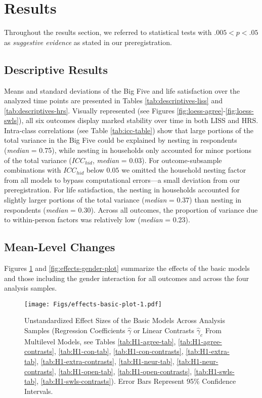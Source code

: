 \documentclass[
  english,
  man,floatsintext]{apa7}
\begin{document}
\hypertarget{results}{%
\section{Results}\label{results}}

Throughout the results section, we referred to statistical tests with \(.005 < p < .05\) as \emph{suggestive evidence} as stated in our preregistration.

\hypertarget{descriptive-results}{%
\subsection{Descriptive Results}\label{descriptive-results}}

Means and standard deviations of the Big Five and life satisfaction over the analyzed time points are presented in Tables \ref{tab:descriptives-liss} and \ref{tab:descriptives-hrs}. Visually represented (see Figures \ref{fig:loess-agree}-\ref{fig:loess-swls}), all six outcomes display marked stability over time in both LISS and HRS. Intra-class correlations (see Table \ref{tab:icc-table}) show that large portions of the total variance in the Big Five could be explained by nesting in respondents (\emph{median} = 0.75), while nesting in households only accounted for minor portions of the total variance (\(ICC_{hid}\), \emph{median} = 0.03). For outcome-subsample combinations with \(ICC_{hid}\) below \(0.05\) we omitted the household nesting factor from all models to bypass computational errors---a small deviation from our preregistration. For life satisfaction, the nesting in households accounted for slightly larger portions of the total variance (\emph{median} = 0.37) than nesting in respondents (\emph{median} = 0.30). Across all outcomes, the proportion of variance due to within-person factors was relatively low (\emph{median} = 0.23).

\hypertarget{mean-level-changes}{%
\subsection{Mean-Level Changes}\label{mean-level-changes}}

Figures \ref{fig:effects-basic-plot} and \ref{fig:effects-gender-plot} summarize the effects of the basic models and those including the gender interaction for all outcomes and across the four analysis samples.



\begin{figure}
\centering
\texttt{[image: Figs/effects-basic-plot-1.pdf]}
\caption{\label{fig:effects-basic-plot}Unstandardized Effect Sizes of the Basic Models Across Analysis Samples (Regression Coefficients \(\hat{\gamma}\) or Linear Contrasts \(\hat{\gamma}_{c}\) From Multilevel Models, see Tables \ref{tab:H1-agree-tab}, \ref{tab:H1-agree-contrasts}, \ref{tab:H1-con-tab}, \ref{tab:H1-con-contrasts}, \ref{tab:H1-extra-tab}, \ref{tab:H1-extra-contrasts}, \ref{tab:H1-neur-tab}, \ref{tab:H1-neur-contrasts}, \ref{tab:H1-open-tab}, \ref{tab:H1-open-contrasts}, \ref{tab:H1-swls-tab}, \ref{tab:H1-swls-contrasts}). Error Bars Represent 95\% Confidence Intervals.}
\end{figure}
\end{document}
